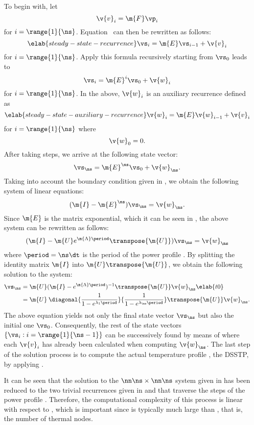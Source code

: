 To begin with, let
\[
  \v{v}_i = \m{F} \vp_i
\]
for $i = \range{1}{\ns}$. Equation~ can then be rewritten as
follows:
\begin{equation} \elab{steady-state-recurrence}
  \vs_i = \m{E} \vs_{i - 1} + \v{v}_i
\end{equation}
for $i = \range{1}{\ns}$. Apply this formula recursively starting from $\vs_0$
leads to
\[
  \vs_i = \m{E}^i \vs_0 + \v{w}_i
\]
for $i = \range{1}{\ns}$. In the above, $\v{w}_i$ is an auxiliary recurrence
defined as
\begin{equation} \elab{steady-state-auxiliary-recurrence}
  \v{w}_i = \m{E} \v{w}_{i - 1} + \v{v}_i
\end{equation}
for $i = \range{1}{\ns}$ where
\[
  \v{w}_0 = 0.
\]
After taking \ns steps, we arrive at the following state vector:
\[
  \vs_\ns = \m{E}^\ns \vs_0 + \v{w}_\ns.
\]
Taking into account the boundary condition given in ,
we obtain the following system of linear equations:
\[
  (\m{I} - \m{E}^\ns) \vs_\ns = \v{w}_\ns.
\]
Since $\m{E}$ is the matrix exponential, which it can be seen in
, the above system can be rewritten as follows:
\[
  (\m{I} - \m{U} e^{\m{\Lambda} \period} \transpose{\m{U}}) \vs_\ns = \v{w}_\ns
\]
where $\period = \ns \dt$ is the period of the power profile \mp. By splitting
the identity matrix $\m{I}$ into $\m{U} \transpose{\m{U}}$, we obtain the
following solution to the system:
\begin{align}
  \vs_\ns
  & = \m{U} (\m{I} - e^{\m{\Lambda} \period})^{-1} \transpose{\m{U}} \v{w}_\ns \elab{t0} \\
  & = \m{U} \: \diagonal{\frac{1}{1 - e^{\lambda_1 \period}}}{\frac{1}{1 - e^{\lambda_\ns \period}}} \transpose{\m{U}} \v{w}_\ns. \nonumber
\end{align}
The above equation yields not only the final state vector $\vs_\ns$ but also the
initial one $\vs_0$. Consequently, the rest of the state vectors $\{ \vs_i: i =
\range{1}{\ns - 1} \}$ can be successively found by means of
 where each $\v{v}_i$ has already been calculated
when computing $\v{w}_\ns$. The last step of the solution process is to compute
the actual temperature profile \mq, the \ac{DSSTP}, by applying
.

It can be seen that the solution to the $\nn \ns \times \nn \ns$ system given in
 has been reduced to the two trivial recurrences given
in  and 
that traverse the \ns steps of the power profile \mp. Therefore, the
computational complexity of this process is linear with respect to \ns, which is
important since \ns is typically much large than \nn, that is, the number of
thermal nodes.

